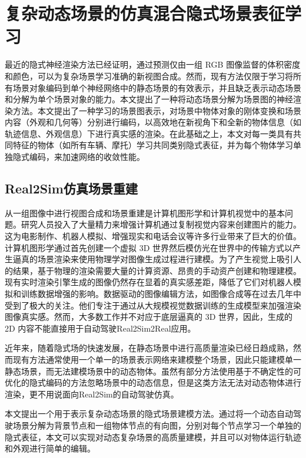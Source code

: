 \chapter{复杂动态场景的仿真混合隐式场景表征学习}
\label{chapter: scene-graph}
最近的隐式神经渲染方法已经证明，通过预测仅由一组 RGB 图像监督的体积密度和颜色，可以为复杂场景学习准确的新视图合成。然而，现有方法仅限于学习将所有场景对象编码到单个神经网络中的静态场景的有效表示，并且缺乏表示动态场景和分解为单个场景对象的能力。本文提出了一种将动态场景分解为场景图的神经渲染方法。本文提出了一种学习的场景图表示，对场景中物体对象的刚体变换和场景内容（外观和几何等）分别进行编码，以高效地在新视角下和全新的物体信息（如轨迹信息、外观信息）下进行真实感的渲染。在此基础之上，本文对每一类具有共同特征的物体（如所有车辆、摩托）学习共同类别隐式表征，并为每个物体学习单独隐式编码，来加速网络的收敛性能。

\section{Real2Sim仿真场景重建}

从一组图像中进行视图合成和场景重建是计算机图形学和计算机视觉中的基本问题。研究人员投入了大量精力来增强计算机通过复制视觉内容来创建图片的能力。这为电影制作、机器人模拟、增强现实和电话会议等许多行业带来了巨大的价值。计算机图形学通过首先创建一个虚拟 3D 世界然后模仿光在世界中的传输方式以产生逼真的场景渲染来使用物理学对图像生成过程进行建模。为了产生视觉上吸引人的结果，基于物理的渲染需要大量的计算资源、昂贵的手动资产创建和物理建模。现有实时渲染引擎生成的图像仍然存在显着的真实感差距，降低了它们对机器人模拟和训练数据增强的影响。数据驱动的图像编辑方法，如图像合成等在过去几年中受到了极大的关注。他们专注于通过从大规模视觉数据训练的生成模型来加强渲染图像真实感。然而，大多数工作并不对应于底层逼真的 3D 世界，因此，生成的 2D 内容不能直接用于自动驾驶Real2Sim2Real应用。

近年来，随着隐式场\cite{mildenhall_nerf_2020, barron_mip-nerf_2022, muller_instant_2022}的快速发展，在静态场景中进行高质量渲染已经日趋成熟，然而现有方法通常使用一个单一的场景表示网络来建模整个场景，因此只能建模单一静态场景，而无法建模场景中的动态物体。虽然有部分方法使用基于不确定性的可优化的隐式编码的方法忽略场景中的动态信息\cite{martin-brualla_nerf_2021}，但是这类方法无法对动态物体进行渲染，更不用说面向Real2Sim的自动驾驶仿真。

本文提出一个用于表示复杂动态场景的隐式场景建模方法。通过将一个动态自动驾驶场景分解为背景节点和一组物体节点的有向图，分别对每个节点学习一个单独的隐式表征，本文可以实现对动态复杂场景的高质量建模，并且可以对物体运行轨迹和外观进行简单的编辑。

